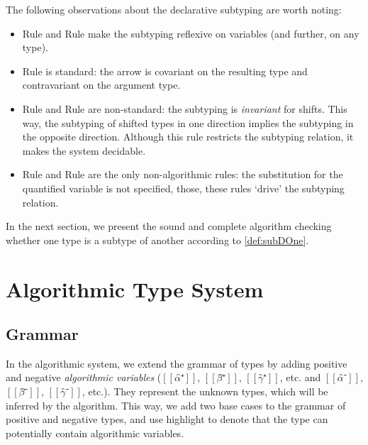 \documentclass[a4,natbib=false]{article}
\newcommand{\ruleref}[1]{Rule \nameref{#1}}
\begin{document}
The following observations about the declarative subtyping are worth noting:
\begin{itemize}
  \item \ruleref{\ottdruleDOneNVarLabel} and \ruleref{\ottdruleDOnePVarLabel}
    make the subtyping reflexive on variables (and further, on any type).
  \item \ruleref{\ottdruleDOneArrowLabel} is standard: the arrow is covariant on the
    resulting type and contravariant on the argument type.
  \item \ruleref{\ottdruleDOneShiftDLabel}  and \ruleref{\ottdruleDOneShiftULabel} are non-standard:
    the subtyping is \emph{invariant} for shifts. 
    This way, the subtyping of shifted types in one direction implies the subtyping
    in the opposite direction.
    Although this rule restricts the
    subtyping relation, it makes the system decidable.
  \item \ruleref{\ottdruleDOneForallLabel} and \ruleref{\ottdruleDOneExistsLabel} are the only
    non-algorithmic rules: the substitution for the quantified variable is
    not specified, those, these rules `drive' the subtyping relation.
\end{itemize}

In the next section, we present the sound and complete algorithm
checking whether one type is a subtype of another according to \cref{def:subDOne}. 

\section{Algorithmic Type System}

\subsection{Grammar}

In the algorithmic system, we extend the grammar of types
by adding positive and negative \emph{algorithmic variables}
($[[α̂⁺]]$, $[[β̂⁺]]$, $[[γ̂⁺]]$, etc. and $[[α̂⁻]]$, $[[β̂⁻]]$, $[[γ̂⁻]]$, etc.).
They represent the unknown types, which will be inferred by the algorithm.
This way, we add two base cases to the grammar of 
positive and negative types, and use highlight to denote that the type
can potentially contain algorithmic variables.

\begin{definition}
  \label{def:algo-types}
  \hfill\\
  \begin{multicols}{2}
    \ottgrammartabular{
      \ottuN\ottinterrule
    }

    \ottgrammartabular{
      \ottuP\ottinterrule
    }
    \columnbreak
  \end{multicols}
\end{definition}
\end{document}

